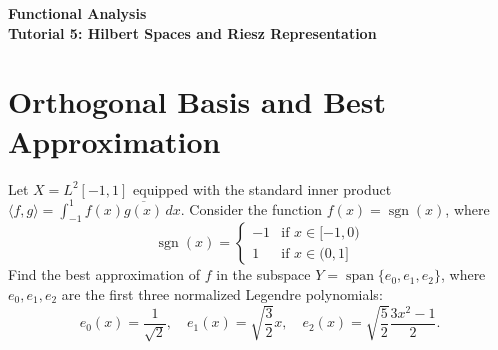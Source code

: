 \documentclass{article}
\begin{document}
\begin{center}
\Large\textbf{
Functional Analysis\\
\vspace{1em}
Tutorial 5: Hilbert Spaces and Riesz Representation
}
\date{}
\end{center}
\vspace{2em}

\tableofcontents

\section{Orthogonal Basis and Best Approximation}

\begin{problem}
    Let $X = L^2[-1, 1]$ equipped with the standard inner product $\langle f, g \rangle = \int_{-1}^1 f(x) \overline{g(x)} \, dx$. Consider the function $f(x) = \operatorname{sgn}(x)$, where
    \[
    \operatorname{sgn}(x) = 
    \begin{cases} 
      -1 & \text{if } x \in [-1, 0) \\
       1 & \text{if } x \in (0, 1] 
    \end{cases}
    \]
    Find the best approximation of $f$ in the subspace $Y = \operatorname{span}\{e_0, e_1, e_2\}$, where $e_0, e_1, e_2$ are the first three normalized Legendre polynomials:
    \[ e_0(x) = \frac{1}{\sqrt{2}}, \quad e_1(x) = \sqrt{\frac{3}{2}} x, \quad e_2(x) = \sqrt{\frac{5}{2}} \frac{3x^2 - 1}{2}. \]
\end{problem}
\end{document}
